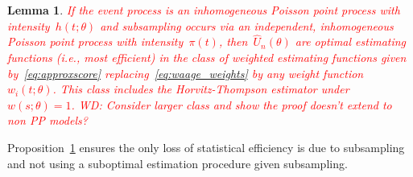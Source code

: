 \documentclass[11pt]{amsart}
\newtheorem{lemma}[thm]{Lemma}
\begin{document}
\begin{lemma} \normalfont
\label{prop:optimal}
\textcolor{red}{
If the event process is an inhomogeneous Poisson point process with intensity~$h(t; \theta)$ and subsampling occurs via an independent, inhomogeneous Poisson point process with intensity~$\pi (t)$, then~$\hat U_n (\theta)$ are optimal estimating functions (i.e., most efficient) in the class of weighted estimating functions given by~\eqref{eq:approxscore} replacing~\eqref{eq:waage_weights} by any weight function~$w_i (t; \theta)$. This class includes the Horvitz-Thompson estimator under~$w(s; \theta) = 1$.
WD: Consider larger class and show the proof doesn't extend to non PP models?}
\end{lemma}

\noindent Proposition~\ref{prop:optimal} ensures the only loss of statistical efficiency is due to subsampling and not using a suboptimal estimation procedure given subsampling.



\end{document}
